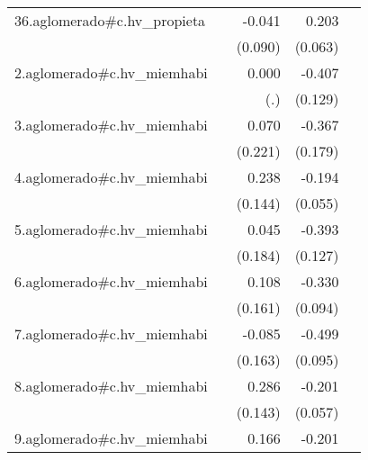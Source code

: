 {\begin{longtable}{l*{4}{D{.}{.}{-1}}}
\addlinespace
36.aglomerado#c.hv\_propieta&                     &      -0.041         &       0.203\sym{**} &                     \\
            &                     &     (0.090)         &     (0.063)         &                     \\
\addlinespace
2.aglomerado#c.hv\_miemhabi&                     &       0.000         &      -0.407\sym{**} &                     \\
            &                     &         (.)         &     (0.129)         &                     \\
\addlinespace
3.aglomerado#c.hv\_miemhabi&                     &       0.070         &      -0.367\sym{*}  &                     \\
            &                     &     (0.221)         &     (0.179)         &                     \\
\addlinespace
4.aglomerado#c.hv\_miemhabi&                     &       0.238         &      -0.194\sym{***}&                     \\
            &                     &     (0.144)         &     (0.055)         &                     \\
\addlinespace
5.aglomerado#c.hv\_miemhabi&                     &       0.045         &      -0.393\sym{**} &                     \\
            &                     &     (0.184)         &     (0.127)         &                     \\
\addlinespace
6.aglomerado#c.hv\_miemhabi&                     &       0.108         &      -0.330\sym{***}&                     \\
            &                     &     (0.161)         &     (0.094)         &                     \\
\addlinespace
7.aglomerado#c.hv\_miemhabi&                     &      -0.085         &      -0.499\sym{***}&                     \\
            &                     &     (0.163)         &     (0.095)         &                     \\
\addlinespace
8.aglomerado#c.hv\_miemhabi&                     &       0.286\sym{*}  &      -0.201\sym{***}&                     \\
            &                     &     (0.143)         &     (0.057)         &                     \\
\addlinespace
9.aglomerado#c.hv\_miemhabi&                     &       0.166         &      -0.201\sym{**} &                     \\

\end{longtable}}
